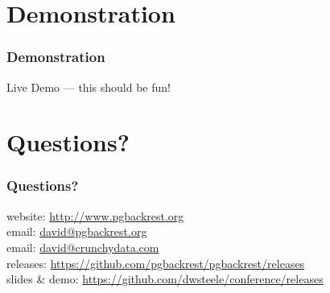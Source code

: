 \section{Demonstration}

\begin{frame}
    \frametitle{Demonstration}

    Live Demo --- this should be fun!
\end{frame}

\section{Questions?}

\begin{frame}
    \frametitle{Questions?}

    website: \url{http://www.pgbackrest.org}\\
    \vspace{1em}
    email: \href{mailto:david@pgbackrest.org}{david@pgbackrest.org} \\
    email: \href{mailto:david@crunchydata.com}{david@crunchydata.com}\\
    \vspace{1em}
    releases: \url{https://github.com/pgbackrest/pgbackrest/releases}\\
    \vspace{1em}
    slides \& demo: \url{https://github.com/dwsteele/conference/releases}\\
\end{frame}


